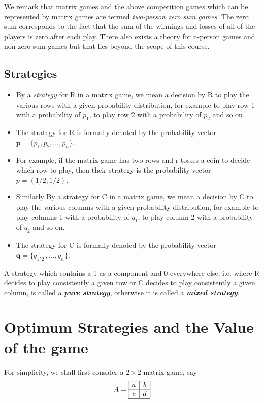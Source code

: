 \documentclass[]{report}
\begin{document}
We remark that matrix games and the above competition games which can be represented
by matrix games are termed \textit{two-person zero sum games}.
The zero sum corresponds to the fact that the sum of the winnings and losses of all of the players
is zero after each play.
There also exists a theory for n-person games and non-zero sum games but that lies beyond the scope of this course.
\subsection{Strategies}
\begin{itemize}
\item By a \textit{strategy} for R in a matrix game, we mean a decision by R to play the various rows with a given probability distribution, for example
 to play row 1 with a probability of $p_1$, to play row 2 with a probability of $p_2$ and so on.
\item The strategy for R is formally denoted by the probability vector $\boldsymbol{p} = \{p_1,p_2,\ldots,p_n\}$.
\item For example, if the matrix game has two rows and r tosses a coin to decide which row to play, then their strategy is the probability vector $p=(1/2,1/2)$.
\item Similarly By a strategy for C in a matrix game, we mean a decision by C to play the various columns with a given probability distribution, for example
 to play columns 1 with a probability of $q_1$, to play column 2 with a probability of $q_2$ and so on.
\item The strategy for C is formally denoted by the probability vector $\boldsymbol{q} = \{q_1,_2,\ldots,q_n\}$.
\end{itemize}
\begin{framed}
A strategy which contains a 1 as a component and 0 everywhere else, i.e. where R decides to play consistently a given 
row or C decides to play consistently a given column, is called a \textbf{\textit{pure strategy}}, otherwise it is called a \textbf{\textit{mixed strategy}}.
\end{framed}
\section{Optimum Strategies and the Value of the game}
For simplicity, we shall first consider a $2 \times 2$ matrix game, say 
\[ A = \begin{array}{|c|c|} \hline
a & b \\ \hline
c & d \\ \hline
\end{array} \]
\end{document}
